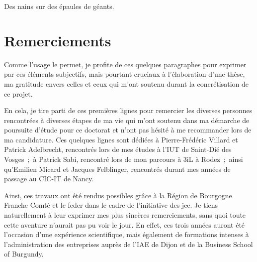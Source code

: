 \documentclass[english,standardlists]{spimubphdthesis}
\begin{document}
\dominitoc



\parbox[t]{\textwidth}
{
    \vspace{1.5cm}
	\begin{fquote}
		Des nains sur des épaules de géants.
	\end{fquote}	
}
	
\chapter*{Remerciements}
Comme l'usage le permet, je profite de ces quelques paragraphes pour exprimer par ces éléments subjectifs, mais pourtant cruciaux à l'élaboration d'une thèse, ma gratitude envers celles et ceux qui m'ont soutenu durant la concrétisation de ce projet.\par

En cela, je tire parti de ces premières lignes pour remercier les diverses personnes rencontrées à diverses étapes de ma vie qui m'ont soutenu dans ma démarche de poursuite d'étude pour ce doctorat et n'ont pas hésité à me recommander lors de ma candidature. Ces quelques lignes sont dédiées à Pierre-Frédéric Villard et Patrick Adelbrecht, rencontrés lors de mes études à l'IUT de Saint-Dié des Vosges~;~à Patrick Sabi, rencontré lors de mon parcours à 3iL à Rodez~;~ainsi qu'Emilien Micard et Jacques Felblinger, rencontrés durant mes années de passage au CIC-IT de Nancy.\par

Ainsi, ces travaux ont été rendus possibles grâce à la Région de Bourgogne Franche Comté et le \gls{feder} dans le cadre de l'initiative des \gls{jce}. Je tiens naturellement à leur exprimer mes plus sincères remerciements, sans quoi toute cette aventure n'aurait pas pu voir le jour. En effet, ces trois années auront été l'occasion d'une expérience scientifique, mais également de formations intenses à l'administration des entreprises auprès de l'IAE de Dijon et de la Business School of Burgundy.\par
\end{document}
